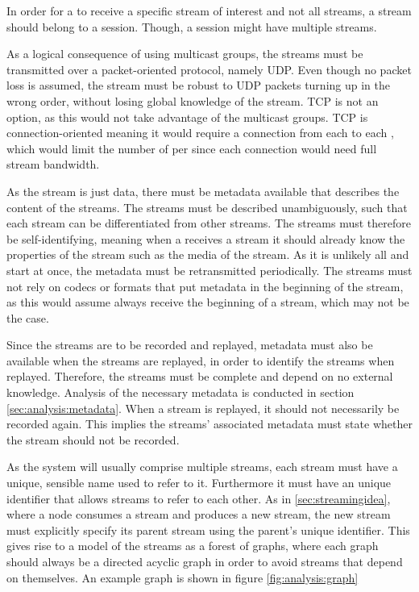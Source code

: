 
In order for a \sub{} to receive a specific stream of interest and not all streams, a stream should belong to a session. Though, a session might have multiple streams. 

As a logical consequence of using multicast groups, the streams must be transmitted over a packet-oriented protocol, namely UDP. Even though no packet loss is assumed, the stream must be robust to UDP packets turning up in the wrong order, without losing global knowledge of the stream. TCP is not an option, as this would not take advantage of the multicast groups. TCP is connection-oriented meaning it would require a connection from each  to each , which would limit the number of  per  since each connection would need full stream bandwidth.

As the stream is just data, there must be metadata available that describes the content of the streams. The streams must be described unambiguously, such that each stream can be differentiated from other streams. The streams must therefore be self-identifying, meaning when a \sub{} receives a stream it should already know the properties of the stream such as the media of the stream. As it is unlikely all \pubs{} and \subs{} start at once, the metadata must be retransmitted periodically. The streams must not rely on codecs or formats that put metadata in the beginning of the stream, as this would assume  always receive the beginning of a stream, which may not be the case.

Since the streams are to be recorded and replayed, metadata must also be available when the streams are replayed, in order to identify the streams when replayed. Therefore, the streams must be complete and depend on no external knowledge. Analysis of the necessary metadata is conducted in section \ref{sec:analysis:metadata}. When a stream is replayed, it should not necessarily be recorded again. This implies the streams' associated metadata must state whether the stream should not be recorded.

As the system will usually comprise multiple streams, each stream must have a unique, sensible name used to refer to it. Furthermore it must have an unique identifier that allows streams to refer to each other.
As in \ref{sec:streamingidea}, where a node consumes a stream and produces a new stream, the new stream must explicitly specify its parent stream using the parent's unique identifier. This gives rise to a model of the streams as a forest of graphs, where each graph should always be a directed acyclic graph in order to avoid streams that depend on themselves. An example graph is shown in figure \ref{fig:analysis:graph}

